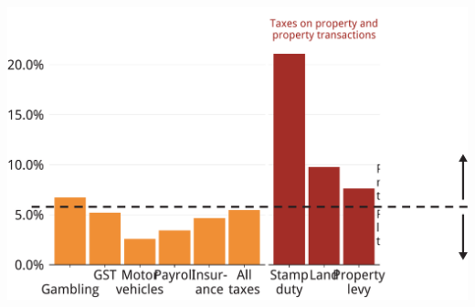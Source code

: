 \documentclass[tikz]{standalone}\usepackage[]{graphicx}\usepackage[]{color}
\newenvironment{knitrout}{}{} %
\begin{document}
\clearpage
\begin{knitrout}
\color{fgcolor}
\includegraphics[width=11.000in,height=7.00in]{./Property-taxes/atlas/figure/PROP-Figure4-1} 

\end{knitrout}
\clearpage
\end{document}
